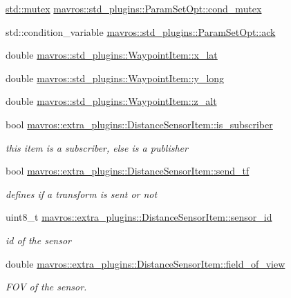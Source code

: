 \begin{DoxyCompactItemize}
\item 
\mbox{\hyperlink{data_8c_a4acff8232e4aec9cd5c6dc200ac55ef3}{std\+::mutex}} \mbox{\hyperlink{group__plugin_gaf0fa92985f3662f53eb22c56db12d544}{mavros\+::std\+\_\+plugins\+::\+Param\+Set\+Opt\+::cond\+\_\+mutex}}
\item 
std\+::condition\+\_\+variable \mbox{\hyperlink{group__plugin_ga621db3cd15ad70ca2fbbf3eb6b8363af}{mavros\+::std\+\_\+plugins\+::\+Param\+Set\+Opt\+::ack}}
\item 
double \mbox{\hyperlink{group__plugin_gacd8bc92567aa5d184991c15ad1e0823b}{mavros\+::std\+\_\+plugins\+::\+Waypoint\+Item\+::x\+\_\+lat}}
\item 
double \mbox{\hyperlink{group__plugin_gac45e1689a1d68f56e3682413006287f6}{mavros\+::std\+\_\+plugins\+::\+Waypoint\+Item\+::y\+\_\+long}}
\item 
double \mbox{\hyperlink{group__plugin_ga6f6da6509e38cfdd28e62615625504dd}{mavros\+::std\+\_\+plugins\+::\+Waypoint\+Item\+::z\+\_\+alt}}
\item 
bool \mbox{\hyperlink{group__plugin_ga51a4de10631a84721596038771ef77ea}{mavros\+::extra\+\_\+plugins\+::\+Distance\+Sensor\+Item\+::is\+\_\+subscriber}}
\begin{DoxyCompactList}\small\item\em this item is a subscriber, else is a publisher \end{DoxyCompactList}\item 
bool \mbox{\hyperlink{group__plugin_ga3488a32205974b427d937ca524aa3aa0}{mavros\+::extra\+\_\+plugins\+::\+Distance\+Sensor\+Item\+::send\+\_\+tf}}
\begin{DoxyCompactList}\small\item\em defines if a transform is sent or not \end{DoxyCompactList}\item 
uint8\+\_\+t \mbox{\hyperlink{group__plugin_gaeac19ed23b46f4e7a3cf3c02ed28da28}{mavros\+::extra\+\_\+plugins\+::\+Distance\+Sensor\+Item\+::sensor\+\_\+id}}
\begin{DoxyCompactList}\small\item\em id of the sensor \end{DoxyCompactList}\item 
double \mbox{\hyperlink{group__plugin_ga347b13757e45e5125842a118c43ef74a}{mavros\+::extra\+\_\+plugins\+::\+Distance\+Sensor\+Item\+::field\+\_\+of\+\_\+view}}
\begin{DoxyCompactList}\small\item\em F\+OV of the sensor. \end{DoxyCompactList}\item 

\end{DoxyCompactItemize}
